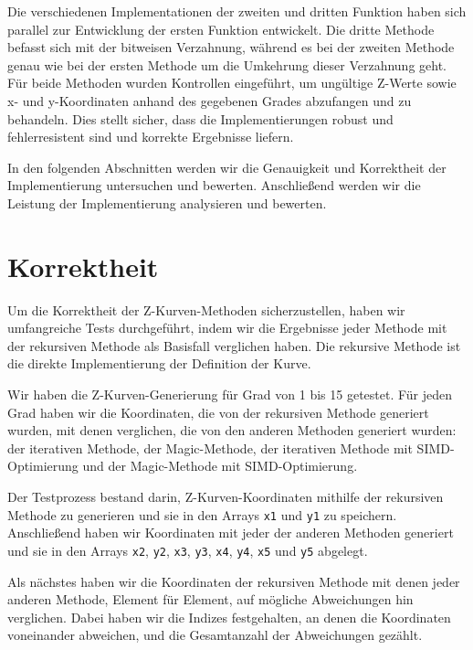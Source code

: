 \documentclass[course=erap]{aspdoc}
\begin{document}
\noindent Die verschiedenen Implementationen der zweiten und dritten Funktion haben sich parallel zur Entwicklung der ersten Funktion entwickelt. Die dritte Methode befasst sich mit der bitweisen Verzahnung, während es bei der zweiten Methode genau wie bei der ersten Methode um die Umkehrung dieser Verzahnung geht. Für beide Methoden wurden Kontrollen eingeführt, um ungültige Z-Werte sowie x- und y-Koordinaten anhand des gegebenen Grades abzufangen und zu behandeln. Dies stellt sicher, dass die Implementierungen robust und fehlerresistent sind und korrekte Ergebnisse liefern.

\noindent In den folgenden Abschnitten werden wir die Genauigkeit und Korrektheit der Implementierung untersuchen und bewerten. Anschließend werden wir die Leistung der Implementierung analysieren und bewerten.
\setlength{\parskip}{1em}

\section{Korrektheit}

\noindent Um die Korrektheit der Z-Kurven-Methoden sicherzustellen, haben wir umfangreiche Tests durchgeführt, indem wir die Ergebnisse jeder Methode mit der rekursiven Methode als Basisfall verglichen haben. Die rekursive Methode ist die direkte Implementierung der Definition der Kurve.

\noindent Wir haben die Z-Kurven-Generierung für Grad von 1 bis 15 getestet. Für jeden Grad haben wir die Koordinaten, die von der rekursiven Methode generiert wurden, mit denen verglichen, die von den anderen Methoden generiert wurden: der iterativen Methode, der Magic-Methode, der iterativen Methode mit SIMD-Optimierung und der Magic-Methode mit SIMD-Optimierung.

\noindent Der Testprozess bestand darin, Z-Kurven-Koordinaten mithilfe der rekursiven Methode zu generieren und sie in den Arrays \texttt{x1} und \texttt{y1} zu speichern. Anschließend haben wir Koordinaten mit jeder der anderen Methoden generiert und sie in den Arrays \texttt{x2}, \texttt{y2}, \texttt{x3}, \texttt{y3}, \texttt{x4}, \texttt{y4}, \texttt{x5} und \texttt{y5} abgelegt.

\noindent Als nächstes haben wir die Koordinaten der rekursiven Methode mit denen jeder anderen Methode, Element für Element, auf mögliche Abweichungen hin verglichen. Dabei haben wir die Indizes festgehalten, an denen die Koordinaten voneinander abweichen, und die Gesamtanzahl der Abweichungen gezählt.
\end{document}
